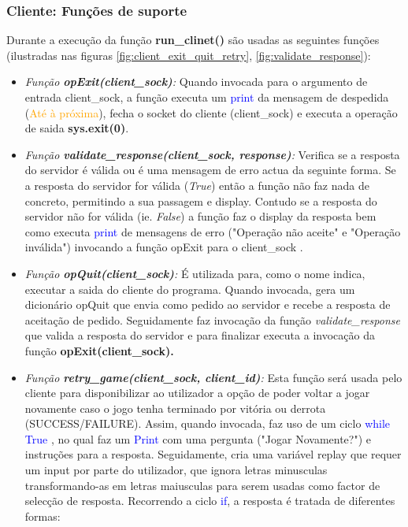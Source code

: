 \subsubsection{Cliente: Funções de suporte}
Durante a execução da função \textbf{run\_clinet()} são usadas as seguintes funções (ilustradas nas figuras \ref{fig:client_exit_quit_retry}, \ref{fig:validate_response}): \\
\begin{itemize}
	\item\textsl{Função \textbf{opExit(client\_sock)}:} Quando invocada para o argumento de entrada client\_sock, a função executa um \textcolor{blue}{print} da mensagem de despedida (\textcolor{orange}{Até à próxima}), fecha o socket do cliente (client\_sock) e executa a operação de saida \textbf{sys.exit(0)}.
	\item\textsl{Função \textbf{validate\_response(client\_sock, response)}:} Verifica se a resposta do servidor é válida ou é uma mensagem de erro actua da seguinte forma. Se a resposta do servidor for válida (\textit{True}) então a função não faz nada de concreto, permitindo a sua passagem e display. Contudo se a resposta do servidor não for válida (ie. \textit{False}) a função faz o display da resposta bem como executa \textcolor{blue}{print} de mensagens de erro ("Operação não aceite" e "Operação inválida") invocando a função opExit para o client\_sock .
	\item\textsl{Função \textbf{opQuit(client\_sock)}:} É utilizada para, como o nome indica, executar a saida do cliente do programa. Quando invocada, gera um dicionário opQuit que envia como pedido ao servidor e recebe a resposta de aceitação de pedido. Seguidamente faz invocação da função \textsl{validate\_response} que valida a resposta do servidor e para  finalizar executa a invocação da função \textbf{opExit(client\_sock).}
	\item\textsl{Função \textbf{retry\_game(client\_sock, client\_id)}:} Esta função será usada pelo cliente para disponibilizar ao utilizador a opção de poder voltar a jogar novamente caso o jogo tenha terminado por vitória ou derrota (SUCCESS/FAILURE). Assim, quando invocada, faz uso de um ciclo \textcolor{blue}{while True} , no qual faz um \textcolor{blue}{Print} com uma pergunta ("Jogar Novamente?") e instruções para a resposta. Seguidamente, cria uma variável replay que requer um input por parte do utilizador, que ignora letras minusculas transformando-as em letras maiusculas para serem usadas como factor de selecção de resposta. Recorrendo a ciclo \textcolor{blue}{if}, a resposta é tratada de diferentes formas:

\end{itemize}
